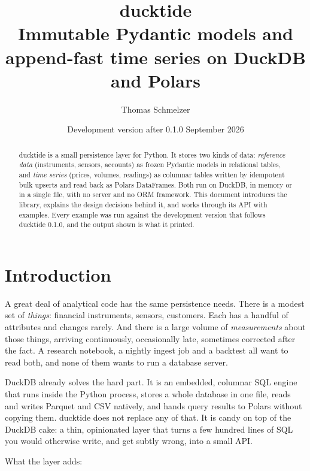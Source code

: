 \documentclass[11pt,a4paper]{article}
\title{\textbf{ducktide}\\[4pt]\large Immutable Pydantic models and append-fast time series on DuckDB and Polars}
\author{Thomas Schmelzer}
\date{Development version after 0.1.0 \quad September 2026}
\begin{document}
\maketitle

\begin{abstract}
\noindent
ducktide is a small persistence layer for Python. It stores two kinds of data:
\emph{reference data} (instruments, sensors, accounts) as frozen Pydantic models in
relational tables, and \emph{time series} (prices, volumes, readings) as columnar tables
written by idempotent bulk upserts and read back as Polars DataFrames. Both run on DuckDB,
in memory or in a single file, with no server and no ORM framework. This document
introduces the library, explains the design decisions behind it, and works through its
API with examples. Every example was run against the development version that follows
ducktide 0.1.0, and the output shown is what it printed.
\end{abstract}

\tableofcontents
\bigskip

\section{Introduction}

A great deal of analytical code has the same persistence needs. There is a modest set
of \emph{things}: financial instruments, sensors, customers. Each has a handful of
attributes and changes rarely. And there is a large volume of \emph{measurements} about
those things, arriving continuously, occasionally late, sometimes corrected after the
fact. A research notebook, a nightly ingest job and a backtest all want to read both, and
none of them wants to run a database server.

DuckDB already solves the hard part. It is an embedded, columnar SQL engine that runs
inside the Python process, stores a whole database in one file, reads and writes Parquet
and CSV natively, and hands query results to Polars without copying them. ducktide does
not replace any of that. It is candy on top of the DuckDB cake: a thin, opinionated layer
that turns a few hundred lines of SQL you would otherwise write, and get subtly wrong, into
a small API.

What the layer adds:
\end{document}
